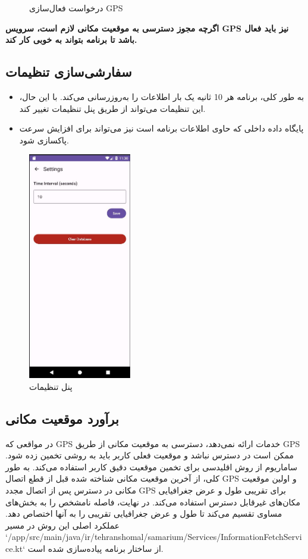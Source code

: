 \documentclass[oneside]{report}
\begin{document}
\begin{center}
\begin{figure}[H]
            \caption{درخواست فعال‌سازی GPS}
      \end{figure}
\end{center}
\textbf{اگرچه مجوز دسترسی به موقعیت مکانی لازم است، سرویس GPS نیز باید فعال باشد تا برنامه بتواند به خوبی کار کند.}

\subsection{سفارشی‌سازی تنظیمات}
\begin{itemize}
      \item به طور کلی، برنامه هر 10 ثانیه یک بار اطلاعات را به‌روزرسانی می‌کند. با این حال، این تنظیمات می‌تواند از طریق پنل تنظیمات تغییر کند.
      \item پایگاه داده داخلی که حاوی اطلاعات برنامه است نیز می‌تواند برای افزایش سرعت پاکسازی شود.
\end{itemize}
\begin{center}
      \begin{figure}[H]
            \centering
            \includegraphics[width=0.4\textwidth]{../images/setting.jpg}
            \caption{پنل تنظیمات}
      \end{figure}
\end{center}

\subsection{برآورد موقعیت مکانی}
در مواقعی که GPS خدمات ارائه نمی‌دهد، دسترسی به موقعیت مکانی از طریق GPS ممکن است در دسترس نباشد و موقعیت فعلی کاربر باید به روشی تخمین زده شود. ساماریوم از روش اقلیدسی برای تخمین موقعیت دقیق کاربر استفاده می‌کند. به طور کلی، از آخرین موقعیت مکانی شناخته شده قبل از قطع اتصال GPS و اولین موقعیت مکانی در دسترس پس از اتصال مجدد GPS برای تقریبی طول و عرض جغرافیایی مکان‌های غیرقابل دسترس استفاده می‌کند. در نهایت، فاصله نامشخص را به بخش‌های مساوی تقسیم می‌کند تا طول و عرض جغرافیایی تقریبی را به آنها اختصاص دهد. عملکرد اصلی این روش در مسیر `/app/src/main/java/ir/tehranshomal/samarium/Services/InformationFetchService.kt` از ساختار برنامه پیاده‌سازی شده است.
\end{document}

